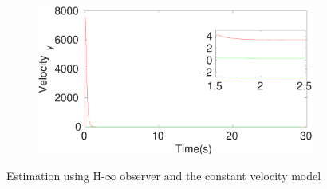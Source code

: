 \begin{figure}[!h]
\begin{subfigure}{.5\linewidth}
\end{subfigure}
\begin{subfigure}{.5\linewidth}
\centering
\includegraphics[width=\linewidth]{figures/HInf/s3cvHInfVelocity_y}
\end{subfigure}
\caption{Estimation using H-$\infty$ observer and the constant velocity model}
\end{figure}


